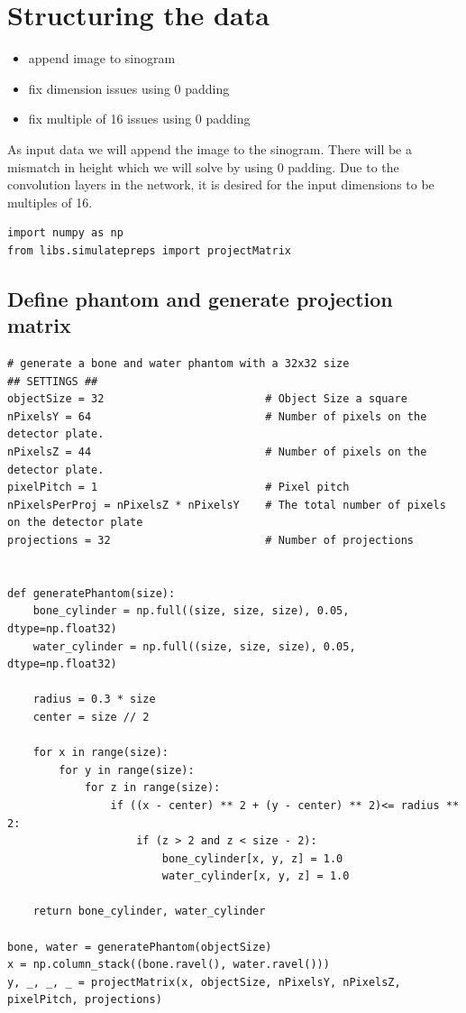 \section{Structuring the data}

\begin{itemize}
\item append image to sinogram
\item fix dimension issues using 0 padding
\item fix multiple of 16 issues using 0 padding
\end{itemize}

As input data we will append the image to the sinogram. There will be a mismatch in height which we will solve by using 0 padding.
Due to the convolution layers in the network, it is desired for the input dimensions to be multiples of 16.

\begin{verbatim}
import numpy as np
from libs.simulatepreps import projectMatrix
\end{verbatim}

\subsection{Define phantom and generate projection matrix}

\begin{verbatim}
# generate a bone and water phantom with a 32x32 size
## SETTINGS ##
objectSize = 32                         # Object Size a square
nPixelsY = 64                           # Number of pixels on the detector plate.
nPixelsZ = 44                           # Number of pixels on the detector plate.
pixelPitch = 1                          # Pixel pitch
nPixelsPerProj = nPixelsZ * nPixelsY    # The total number of pixels on the detector plate
projections = 32                        # Number of projections


def generatePhantom(size):
    bone_cylinder = np.full((size, size, size), 0.05, dtype=np.float32)
    water_cylinder = np.full((size, size, size), 0.05, dtype=np.float32)

    radius = 0.3 * size
    center = size // 2

    for x in range(size):
        for y in range(size):
            for z in range(size):
                if ((x - center) ** 2 + (y - center) ** 2)<= radius ** 2:
                    if (z > 2 and z < size - 2):
                        bone_cylinder[x, y, z] = 1.0
                        water_cylinder[x, y, z] = 1.0

    return bone_cylinder, water_cylinder

bone, water = generatePhantom(objectSize)
x = np.column_stack((bone.ravel(), water.ravel()))
y, _, _, _ = projectMatrix(x, objectSize, nPixelsY, nPixelsZ, pixelPitch, projections)
\end{verbatim}

